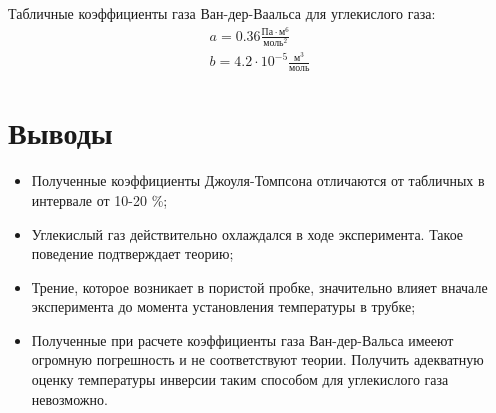 \documentclass[a4paper, 12pt]{article}
\begin{document}
\noindent Табличные коэффициенты газа Ван-дер-Ваальса для углекислого газа:\\
	\begin{equation}
		\begin{aligned}
				a = 0.36 \frac{\text{Па} \cdot \text{м}^6}{\text{моль}^2}\\
				b = 4.2 \cdot 10^{-5} \frac{\text{м}^3}{\text{моль}}
		\end{aligned}
	\end{equation}
  

	
	
	\section{Выводы}
	\begin{itemize}
		\item Полученные коэффициенты Джоуля-Томпсона отличаются от табличных в интервале от 10-20 \%;
		\item Углекислый газ действительно охлаждался в ходе эксперимента. Такое поведение подтверждает теорию;
		\item Трение, которое возникает в пористой пробке, значительно влияет вначале эксперимента до момента установления температуры в трубке;
		\item Полученные при расчете коэффициенты газа Ван-дер-Вальса имееют огромную погрешность и не соответствуют теории. Получить адекватную оценку температуры инверсии таким способом для углекислого газа невозможно.
	\end{itemize}
	
\end{document}

